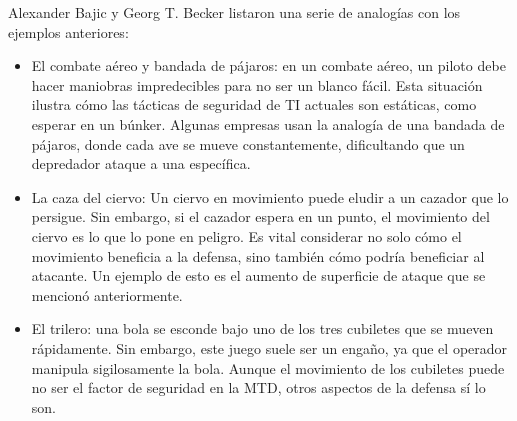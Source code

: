 Alexander Bajic y Georg T. Becker listaron una serie de analogías\cite{MTD-critica} con los ejemplos anteriores:
\begin{itemize}
    \item El combate aéreo y bandada de pájaros: en un combate aéreo, un piloto debe hacer maniobras impredecibles para no ser un blanco fácil. Esta situación ilustra cómo las tácticas de seguridad de TI actuales son estáticas, como esperar en un búnker. Algunas empresas usan la analogía de una bandada de pájaros, donde cada ave se mueve constantemente, dificultando que un depredador ataque a una específica.
    \item La caza del ciervo: Un ciervo en movimiento puede eludir a un cazador que lo persigue. Sin embargo, si el cazador espera en un punto, el movimiento del ciervo es lo que lo pone en peligro. Es vital considerar no solo cómo el movimiento beneficia a la defensa, sino también cómo podría beneficiar al atacante. Un ejemplo de esto es el aumento de superficie de ataque que se mencionó anteriormente.
    \item El trilero: una bola se esconde bajo uno de los tres cubiletes que se mueven rápidamente. Sin embargo, este juego suele ser un engaño, ya que el operador manipula sigilosamente la bola. Aunque el movimiento de los cubiletes puede no ser el factor de seguridad en la MTD, otros aspectos de la defensa sí lo son.
\end{itemize}

